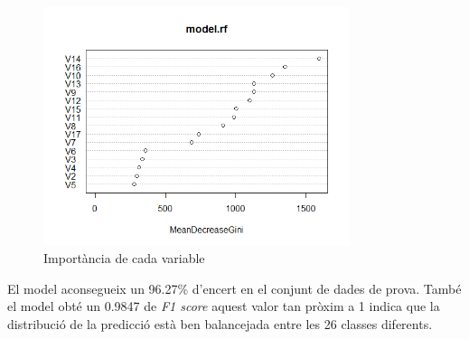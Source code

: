 \begin{figure}[H]
    \centering
    \includegraphics[width=0.8\textwidth]{img/importanceRF.png}
    \caption{Importància de cada variable}
    \label{fig:imp}
\end{figure}

El model aconsegueix un 96.27\% d'encert en el conjunt de dades de prova. També el model obté un 0.9847 de \textit{F1 score} aquest valor tan pròxim a 1 indica que la distribució de la predicció està ben balancejada entre les 26 classes diferents. 
